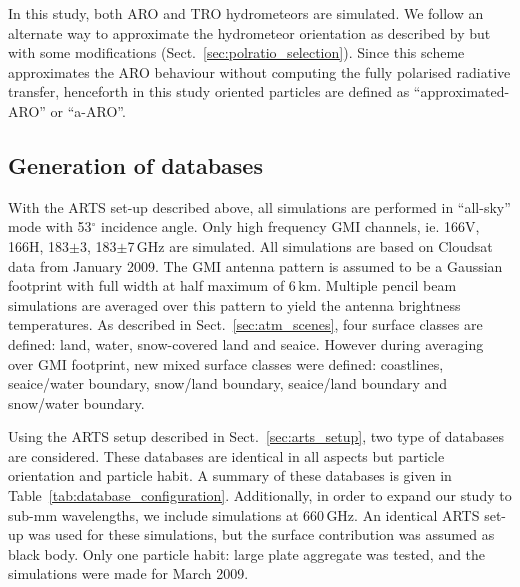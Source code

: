 \documentclass[amt, manuscript]{copernicus}
\begin{document}

In this study, both ARO and TRO hydrometeors are simulated. We follow an alternate way to approximate the hydrometeor orientation as described by \citet{barlakas:intro:21} but with some modifications (Sect.~\ref{sec:polratio_selection}). Since this scheme approximates the ARO behaviour without computing the fully polarised radiative transfer, henceforth in this study oriented particles are defined as  ``approximated-ARO'' or ``a-ARO''. 

\subsection{Generation of databases}
\label{sec:database}

With the ARTS set-up described above, all simulations are performed in ``all-sky'' mode with 53$^{\circ}$ incidence angle. Only high frequency GMI channels, ie. 166V, 166H, 183$\pm$3, 183$\pm$7\,GHz are simulated. All simulations are based on Cloudsat data from January 2009. The GMI antenna pattern is assumed to be a Gaussian footprint with full width at half maximum of 6\,km. Multiple pencil beam simulations are averaged over this pattern to yield the antenna brightness temperatures. As described in Sect.~\ref{sec:atm_scenes}, four surface classes are defined: land, water, snow-covered land and seaice. However during averaging over GMI footprint, new mixed surface classes were defined: coastlines, seaice/water boundary, snow/land boundary, seaice/land boundary and snow/water boundary. 

Using the ARTS setup described in Sect.~\ref{sec:arts_setup}, two type of databases are considered. These databases are identical in all aspects but particle orientation and particle habit. A summary of these databases is given in Table~\ref{tab:database_configuration}.  Additionally, in order to expand our study to sub-mm wavelengths, we include simulations at 660\,GHz. An identical ARTS set-up was used for these simulations, but the surface contribution was assumed as black body. Only one particle habit: large plate aggregate was tested, and the simulations were made for March 2009.
  
\end{document}
